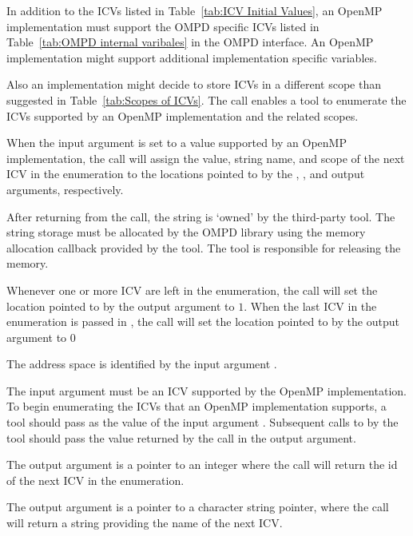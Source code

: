 \begin{itemize}
\descr
In addition to the ICVs listed in Table~\ref{tab:ICV Initial Values}, an OpenMP 
implementation must support the OMPD specific ICVs listed in Table~\ref{tab:OMPD internal varibales} in 
the OMPD interface.
An OpenMP implementation might support additional implementation specific variables.

Also an implementation might decide to store ICVs in a different scope than suggested in 
Table~\ref{tab:Scopes of ICVs}.
The  call enables a tool to enumerate the ICVs supported by an 
OpenMP implementation and the related scopes.

When the  input argument is set to a value supported by an OpenMP 
implementation,
the call will assign the value, string name, and scope of the next ICV in the enumeration
to the locations pointed to by the 
, , and  output arguments, respectively.

After returning from the call, the string  is `owned' by the 
third-party tool.
The string storage must be allocated by the OMPD library using the memory allocation 
callback provided by the tool.
The tool is responsible for releasing the memory.


Whenever one or more ICV are left in the enumeration,
the call will set the location pointed to by the  
output argument to $1$.
When the last ICV in the enumeration is passed in , 
the call will set the location pointed to by the  output
argument to $0$


\argdesc

The address space is identified by the input argument .

The input argument  must be an ICV supported by the OpenMP implementation.  
To begin enumerating the ICVs that an OpenMP implementation supports, a tool should pass
 as the value of the input argument .  
Subsequent calls to  by the tool should pass the
value returned by the call in the  output argument.

The output argument  is a pointer to an integer where
the call will return the id of the next ICV in the
enumeration.

The output argument  is a pointer to a
character string pointer, where the call will return a string
providing the name of the next ICV.


\end{itemize}
